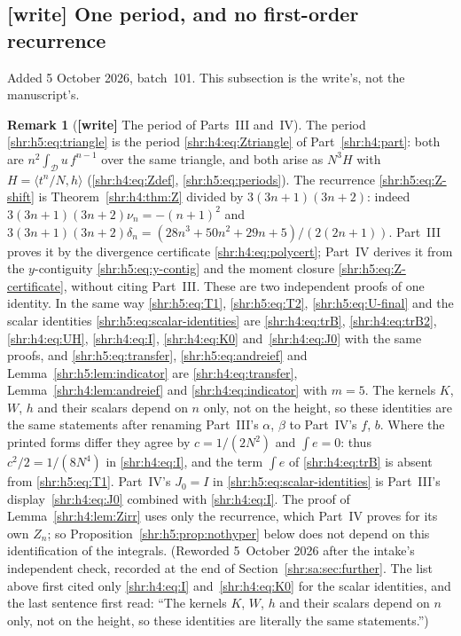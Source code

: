 \documentclass[11pt,letterpaper]{article}
\numberwithin{equation}{section}
\theoremstyle{definition}
\newtheorem{remark}[theorem]{Remark}
\newcommand{\1}{\mathbf 1}
\newcommand{\ip}[2]{\langle #1,#2\rangle}
\begin{document}
\subsection{[write] One period, and no first-order recurrence}
\label{shr:h5:sec:write}

Added 5 October 2026, batch~101. This subsection is the write's, not the
manuscript's.

\begin{remark}[\textbf{[write]} The period of Parts~III and~IV]
\label{shr:h5:rem:sameZ}
The period \eqref{shr:h5:eq:triangle} is the period \eqref{shr:h4:eq:Ztriangle}
of Part~\ref{shr:h4:part}: both are $n^2\int_{\mathcal D}u\,f^{n-1}$ over the
same triangle, and both arise as $N^3H$ with $H=\ip{t^n/N}{h}$
(\eqref{shr:h4:eq:Zdef}, \eqref{shr:h5:eq:periods}). The recurrence
\eqref{shr:h5:eq:Z-shift} is Theorem~\ref{shr:h4:thm:Z} divided by
$3(3n+1)(3n+2)$: indeed $3(3n+1)(3n+2)\nu_n=-(n+1)^2$ and
$3(3n+1)(3n+2)\delta_n=(28n^3+50n^2+29n+5)/(2(2n+1))$. Part~III proves it
by the divergence certificate \eqref{shr:h4:eq:polycert}; Part~IV derives it
from the $y$-contiguity \eqref{shr:h5:eq:y-contig} and the moment closure
\eqref{shr:h5:eq:Z-certificate}, without citing Part~III. These are two
independent proofs of one identity. In the same way \eqref{shr:h5:eq:T1},
\eqref{shr:h5:eq:T2}, \eqref{shr:h5:eq:U-final} and the scalar identities
\eqref{shr:h5:eq:scalar-identities} are \eqref{shr:h4:eq:trB},
\eqref{shr:h4:eq:trB2}, \eqref{shr:h4:eq:UH}, \eqref{shr:h4:eq:I},
\eqref{shr:h4:eq:K0} and~\eqref{shr:h4:eq:J0} with the same proofs, and \eqref{shr:h5:eq:transfer},
\eqref{shr:h5:eq:andreief} and Lemma~\ref{shr:h5:lem:indicator} are
\eqref{shr:h4:eq:transfer}, Lemma~\ref{shr:h4:lem:andreief} and
\eqref{shr:h4:eq:indicator} with $m=5$. The kernels $K$, $W$, $h$ and their
scalars depend on $n$ only, not on the height, so these identities are the
same statements after renaming Part~III's $\alpha$, $\beta$ to Part~IV's
$f$, $b$. Where the printed forms differ they agree by $c=1/(2N^2)$ and
$\int e=0$: thus $c^2/2=1/(8N^4)$ in \eqref{shr:h4:eq:I}, and the term
$\int e$ of \eqref{shr:h4:eq:trB} is absent from \eqref{shr:h5:eq:T1}.
Part~IV's $J_0=I$ in \eqref{shr:h5:eq:scalar-identities} is Part~III's
display~\eqref{shr:h4:eq:J0} combined with \eqref{shr:h4:eq:I}. The proof
of Lemma~\ref{shr:h4:lem:Zirr} uses only the recurrence, which Part~IV
proves for its own $Z_n$; so Proposition~\ref{shr:h5:prop:nothyper} below
does not depend on this identification of the integrals. (Reworded
5~October 2026 after the intake's independent check, recorded at the end
of Section~\ref{shr:sa:sec:further}. The list above first cited only
\eqref{shr:h4:eq:I} and~\eqref{shr:h4:eq:K0} for the scalar identities,
and the last sentence first read: ``The kernels $K$, $W$, $h$ and their
scalars depend on $n$ only, not on the height, so these identities are
literally the same statements.'')
\end{remark}
\end{document}
